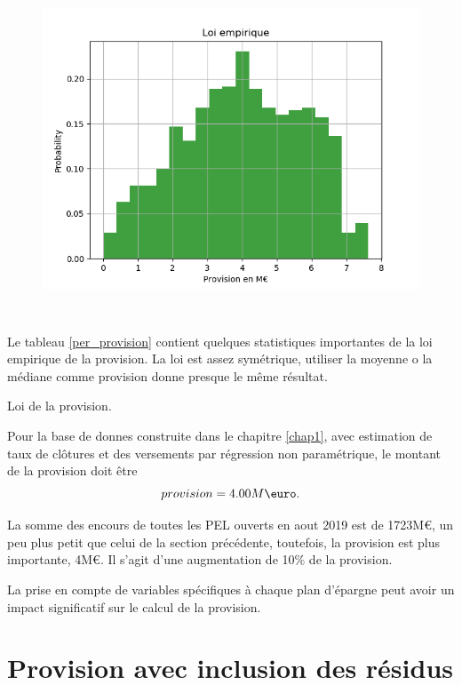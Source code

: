 \documentclass[12pt, a4paper]{book}
\begin{document}
{\begin{figure}[!h]
\label{loi_empirique_h}
\centering
\includegraphics[height=10cm,width=16cm]{Population_homogene/loi_empirique.png}
\end{figure}
Le tableau \ref{per_provision} contient quelques statistiques importantes de la loi empirique de la provision. La loi est assez symétrique, utiliser la moyenne o la médiane comme provision donne presque le même résultat. 
\begin{table}[h!]
	\caption{Loi de la provision.}
	\bigskip	
	\label{per_provision_h}
	\centering
\end{table}

Pour la base de donnes construite dans le chapitre \ref{chap1}, avec estimation de taux de clôtures et des versements par régression non paramétrique, le montant de la provision doit être
$$ provision = 4.00M\mbox{\euro}.$$

La somme des encours de toutes les PEL ouverts en aout 2019 est de 1723M\euro, un peu plus petit que celui de la section précédente, toutefois, la provision est plus importante, 4M\euro. Il s'agit d'une augmentation de 10\% de la provision. 

La prise en compte de variables spécifiques à chaque plan d'épargne peut avoir un impact significatif sur le calcul de la provision.

\section{Provision avec inclusion des résidus}

}
\end{document}

